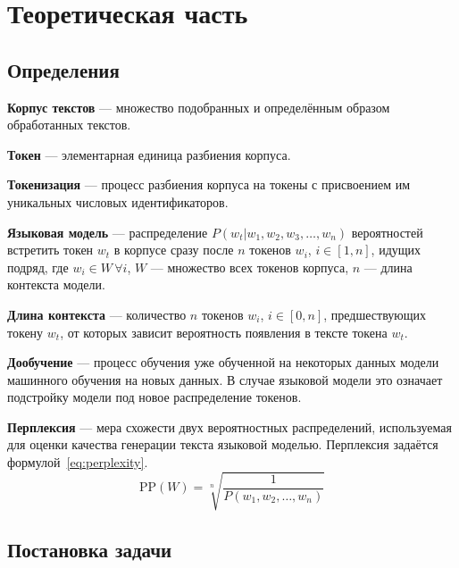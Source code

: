 \chapter{Теоретическая часть}
\label{cha:theory}

\section{Определения}

\textbf{Корпус текстов} --- множество подобранных и определённым образом обработанных текстов.

\textbf{Токен} --- элементарная единица разбиения корпуса.

\textbf{Токенизация} --- процесс разбиения корпуса на токены с присвоением им уникальных числовых идентификаторов.

\textbf{Языковая модель} --- распределение $P(w_t | w_1,w_2,w_3,\dots,w_n)$ вероятностей встретить токен $w_t$ в корпусе сразу после $n$ токенов $w_i$, $i\in[1, n]$, идущих подряд, где $w_i \in W \, \forall i$, $W$ --- множество всех токенов корпуса, $n$ --- длина контекста модели.

\textbf{Длина контекста} --- количество $n$ токенов $w_i$, $i\in[0, n]$, предшествующих токену $w_t$, от которых зависит вероятность появления в тексте токена $w_t$.

\textbf{Дообучение} --- процесс обучения уже обученной на некоторых данных модели машинного обучения на новых данных. В случае языковой модели это означает подстройку модели под новое распределение токенов.

\textbf{Перплексия} --- мера схожести двух вероятностных распределений, используемая для оценки качества генерации текста языковой моделью. Перплексия задаётся формулой \ref*{eq:perplexity}.
\begin{equation}
    \label{eq:perplexity}
    \textrm{PP}(W)=\sqrt[n]{\frac{1}{P(w_1,w_2,\dots,w_n)}}
\end{equation}

\section{Постановка задачи}

